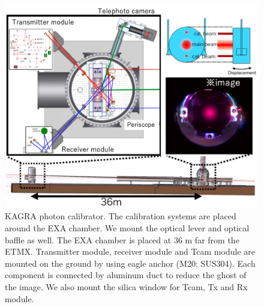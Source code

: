 \begin{figure}
\begin{center}
\includegraphics[bb=0 0 1079 860, width=15cm]{Figures/Pcal_overview_Xend.png}
\caption{KAGRA photon calibrator. The calibration systems are placed around the EXA chamber. We mount the optical lever and optical baffle as well. The EXA chamber is placed at 36 m far from the ETMX. Transmitter module, receiver module and Tcam module are mounted on the ground by using eagle anchor (M20; SUS304). Each component is connected by aluminum duct to reduce the ghost of the image. We also mount the silica window for Tcam, Tx and Rx module.} 
\label{fig:Pcal_overview} 
\end{center}
\end{figure}

